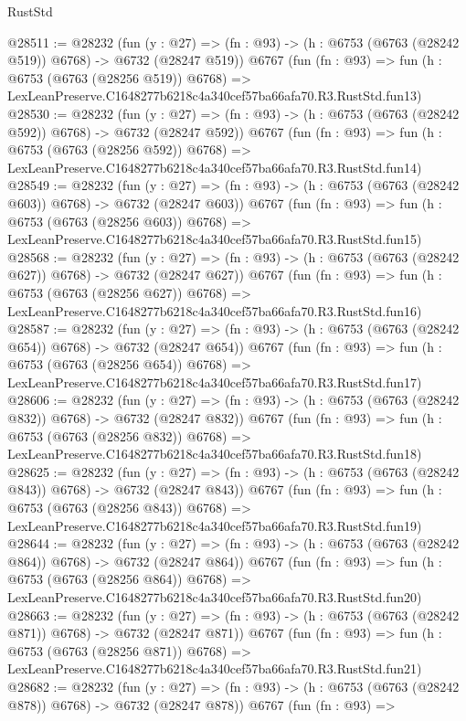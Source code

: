 \begin{lexlean}{RustStd}
\begin{coremodule}
@28511 := @28232
    (fun (y : @27) => (fn : @93) -> (h : @6753 (@6763 (@28242 @519)) @6768) -> @6732 (@28247 @519))
    @6767
    (fun (fn : @93) =>
    fun (h : @6753 (@6763 (@28256 @519)) @6768) =>
    LexLeanPreserve.C1648277b6218c4a340cef57ba66afa70.R3.RustStd.fun13)
@28530 := @28232
    (fun (y : @27) => (fn : @93) -> (h : @6753 (@6763 (@28242 @592)) @6768) -> @6732 (@28247 @592))
    @6767
    (fun (fn : @93) =>
    fun (h : @6753 (@6763 (@28256 @592)) @6768) =>
    LexLeanPreserve.C1648277b6218c4a340cef57ba66afa70.R3.RustStd.fun14)
@28549 := @28232
    (fun (y : @27) => (fn : @93) -> (h : @6753 (@6763 (@28242 @603)) @6768) -> @6732 (@28247 @603))
    @6767
    (fun (fn : @93) =>
    fun (h : @6753 (@6763 (@28256 @603)) @6768) =>
    LexLeanPreserve.C1648277b6218c4a340cef57ba66afa70.R3.RustStd.fun15)
@28568 := @28232
    (fun (y : @27) => (fn : @93) -> (h : @6753 (@6763 (@28242 @627)) @6768) -> @6732 (@28247 @627))
    @6767
    (fun (fn : @93) =>
    fun (h : @6753 (@6763 (@28256 @627)) @6768) =>
    LexLeanPreserve.C1648277b6218c4a340cef57ba66afa70.R3.RustStd.fun16)
@28587 := @28232
    (fun (y : @27) => (fn : @93) -> (h : @6753 (@6763 (@28242 @654)) @6768) -> @6732 (@28247 @654))
    @6767
    (fun (fn : @93) =>
    fun (h : @6753 (@6763 (@28256 @654)) @6768) =>
    LexLeanPreserve.C1648277b6218c4a340cef57ba66afa70.R3.RustStd.fun17)
@28606 := @28232
    (fun (y : @27) => (fn : @93) -> (h : @6753 (@6763 (@28242 @832)) @6768) -> @6732 (@28247 @832))
    @6767
    (fun (fn : @93) =>
    fun (h : @6753 (@6763 (@28256 @832)) @6768) =>
    LexLeanPreserve.C1648277b6218c4a340cef57ba66afa70.R3.RustStd.fun18)
@28625 := @28232
    (fun (y : @27) => (fn : @93) -> (h : @6753 (@6763 (@28242 @843)) @6768) -> @6732 (@28247 @843))
    @6767
    (fun (fn : @93) =>
    fun (h : @6753 (@6763 (@28256 @843)) @6768) =>
    LexLeanPreserve.C1648277b6218c4a340cef57ba66afa70.R3.RustStd.fun19)
@28644 := @28232
    (fun (y : @27) => (fn : @93) -> (h : @6753 (@6763 (@28242 @864)) @6768) -> @6732 (@28247 @864))
    @6767
    (fun (fn : @93) =>
    fun (h : @6753 (@6763 (@28256 @864)) @6768) =>
    LexLeanPreserve.C1648277b6218c4a340cef57ba66afa70.R3.RustStd.fun20)
@28663 := @28232
    (fun (y : @27) => (fn : @93) -> (h : @6753 (@6763 (@28242 @871)) @6768) -> @6732 (@28247 @871))
    @6767
    (fun (fn : @93) =>
    fun (h : @6753 (@6763 (@28256 @871)) @6768) =>
    LexLeanPreserve.C1648277b6218c4a340cef57ba66afa70.R3.RustStd.fun21)
@28682 := @28232
    (fun (y : @27) => (fn : @93) -> (h : @6753 (@6763 (@28242 @878)) @6768) -> @6732 (@28247 @878))
    @6767
    (fun (fn : @93) =>

\end{coremodule}
\end{lexlean}
